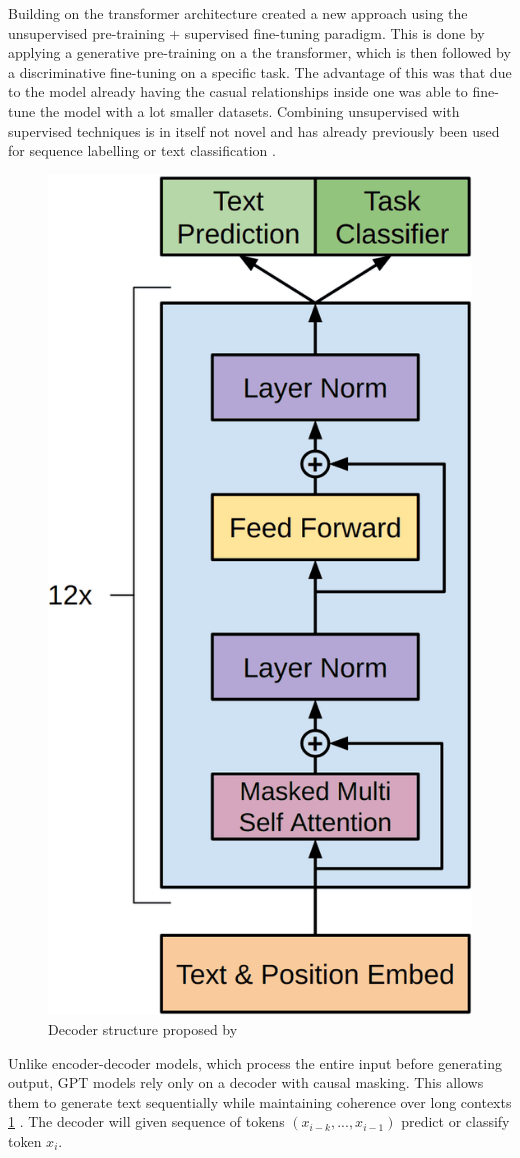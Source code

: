 Building on the transformer architecture \citep{radford2018improving} created a new approach using the unsupervised pre-training + supervised fine-tuning paradigm. This is done by applying a generative pre-training on a the transformer, which is then followed by a discriminative fine-tuning on a specific task. The advantage of this was that due to the model already having the casual relationships inside one was able to fine-tune the model with a lot smaller datasets. Combining unsupervised with supervised techniques is in itself not novel and has already previously been used for sequence labelling or text classification \citep{van2020survey, yarowsky1995unsupervised}.


\begin{figure}
    \centering
    \includegraphics[width=0.5\linewidth]{imgs/decoder.png}
    \caption{Decoder structure proposed by \citet{radford2018improving}}
    \label{fig:decoder}
\end{figure}

Unlike encoder-decoder models, which process the entire input before generating output, GPT models rely only on a decoder with causal masking. This allows them to generate text sequentially while maintaining coherence over long contexts \ref{fig:decoder} \citep{radford2018improving,brown2020language}. The decoder will given sequence of tokens $(x_{i-k},...,x_{i-1})$ predict or classify token $x_i$. 



